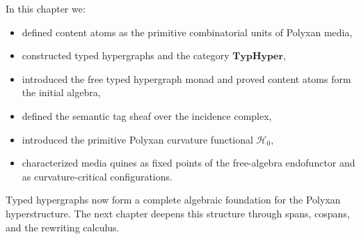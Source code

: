 In this chapter we:
\begin{itemize}
\item defined content atoms as the primitive combinatorial units of Polyxan media,
\item constructed typed hypergraphs and the category $\mathbf{TypHyper}$,
\item introduced the free typed hypergraph monad and proved content atoms
  form the initial algebra,
\item defined the semantic tag sheaf over the incidence complex,
\item introduced the primitive Polyxan curvature functional $\mathcal{H}_0$,
\item characterized media quines as fixed points of the free-algebra
  endofunctor and as curvature-critical configurations.
\end{itemize}

Typed hypergraphs now form a complete algebraic foundation for the Polyxan
hyperstructure.  The next chapter deepens this structure through spans,
cospans, and the rewriting calculus.

